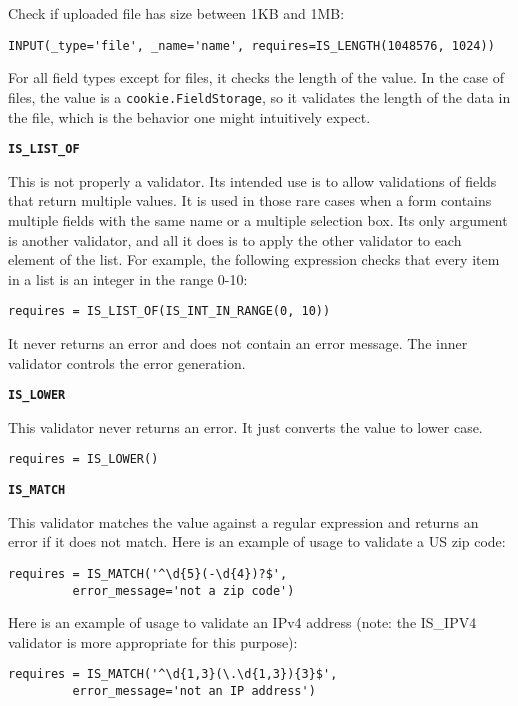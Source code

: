 \documentclass[justified,sixbynine,notoc]{tufte-book}
\def\ft{\small\tt}
\def\inxx#1{\index{#1}}
\begin{document}
\begin{fullwidth}
Check if uploaded file has size between 1KB and 1MB:
\begin{lstlisting}
INPUT(_type='file', _name='name', requires=IS_LENGTH(1048576, 1024))
\end{lstlisting}

For all field types except for files, it checks the length of the value. In the case of files, the value is a {\ft cookie.FieldStorage}, so it validates the length of the data in the file, which is the behavior one might intuitively expect.

{\bf {\ft IS\_LIST\_OF}}

\inxx{IS\_LIST\_OF}

This is not properly a validator. Its intended use is to allow validations of fields that return multiple values. It is used in those rare cases when a form contains multiple fields with the same name or a multiple selection box. Its only argument is another validator, and all it does is to apply the other validator to each element of the list. For example, the following expression checks that every item in a list is an integer in the range 0-10:
\begin{lstlisting}
requires = IS_LIST_OF(IS_INT_IN_RANGE(0, 10))
\end{lstlisting}

It never returns an error and does not contain an error message. The inner validator controls the error generation.

{\bf {\ft IS\_LOWER}}

\inxx{IS\_LOWER}

This validator never returns an error. It just converts the value to lower case.
\begin{lstlisting}
requires = IS_LOWER()
\end{lstlisting}

{\bf {\ft IS\_MATCH}}

\inxx{IS\_MATCH}

This validator matches the value against a regular expression and returns an error if it does not match.
Here is an example of usage to validate a US zip code:
\begin{lstlisting}
requires = IS_MATCH('^\d{5}(-\d{4})?$',
         error_message='not a zip code')
\end{lstlisting}

Here is an example of usage to validate an IPv4 address (note: the IS\_IPV4 validator is more appropriate for this purpose):
\begin{lstlisting}
requires = IS_MATCH('^\d{1,3}(\.\d{1,3}){3}$',
         error_message='not an IP address')
\end{lstlisting}


\end{fullwidth}
\end{document}
